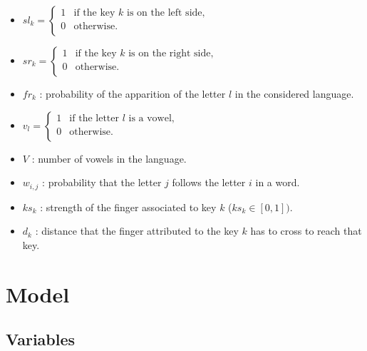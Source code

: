 \documentclass[a4paper,titlepage]{article}
\begin{document}
\begin{itemize}		
	\item $sl_{k} = \left\{ 
	\begin{array}{ll}
		1 & \text{if the key $k$ is on the left side,}\\
		0 & \text{otherwise.}\\
	\end{array}
	\right.$

	\item $sr_{k} = \left\{ 
	\begin{array}{ll}
		1 & \text{if the key $k$ is on the right side,}\\
		0 & \text{otherwise.}\\
	\end{array}
	\right.$

	\item $fr_k$ : probability of the apparition of the letter $l$ in the considered language.

	\item $v_{l} = \left\{ 
	\begin{array}{ll}
		1 & \text{if the letter $l$ is a vowel,}\\
		0 & \text{otherwise.}\\
	\end{array}
	\right.$

	\item $V$ : number of vowels in the language.

	\item $w_{i,j}$ : probability that the letter $j$ follows the letter $i$ in a word. 

	\item $ks_{k}$ : strength of the finger associated to key $k$ ($ks_k \in [0,1])$.

	\item $d_k$ : distance that the finger attributed to the key $k$ has to cross to reach that key.
\end{itemize}




\section{Model}

	\subsection{Variables}
\end{document}
